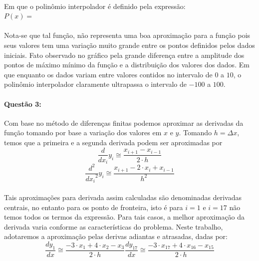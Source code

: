 \documentclass[a4paper,11pt]{article}
\begin{document}

\paragraph{}Em que o polinômio interpolador é definido pela expressão:
{\\$P(x) =$\  \centering}
\paragraph{}Nota-se que tal função, não representa uma boa aproximação para a função pois seus valores tem uma variação muito grande entre os pontos definidos pelos dados iniciais. Fato observado no gráfico pela grande diferença entre a amplitude dos pontos de máximo mínimo da função e a distribuição dos valores dos dados. Em que enquanto os dados variam entre valores contidos no intervalo de $0$ a $10$, o polinômio interpolador claramente ultrapassa o intervalo de $-100$ a $100$.

\paragraph{Questão 3:}Com base no método de diferenças finitas podemos aproximar as derivadas da função tomando por base a variação dos valores em $x$ e $y$. Tomando $h = \Delta x$, temos que a primeira e a segunda derivada podem ser aproximadas por
\begin{equation}
\frac{d}{dx_i}y_i \cong \frac{x_{i+1} - x_{i-1}}{2\cdot h}
\end{equation}
\begin{equation}
\frac{d^2}{{dx_i}^2}y_i \cong \frac{x_{i+1} - 2\cdot x_{i} + x_{i-1}}{h^2}
\end{equation}
\paragraph{}Tais aproximações para derivada assim calculadas são denominadas  derivadas centrais, no entanto para os ponto de fronteira, isto é para $i=1$ e $i=17$ não temos todos os termos da expressão. Para tais casos, a melhor aproximação da derivada varia conforme as características do problema. Neste trabalho, adotaremos a aproximação pelas derivas adiantas e atrasadas, dadas por:
\begin{subequations}
\begin{equation}
\frac{dy_1}{dx} \cong \frac{-3\cdot x_1 + 4\cdot x_2 -x_3}{2\cdot h}
\end{equation}
\begin{equation}
\frac{dy_{17}}{dx} \cong \frac{-3\cdot x_{17} + 4\cdot x_{16} -x_{15}}{2\cdot h}
\end{equation}
\end{subequations}
\end{document}
